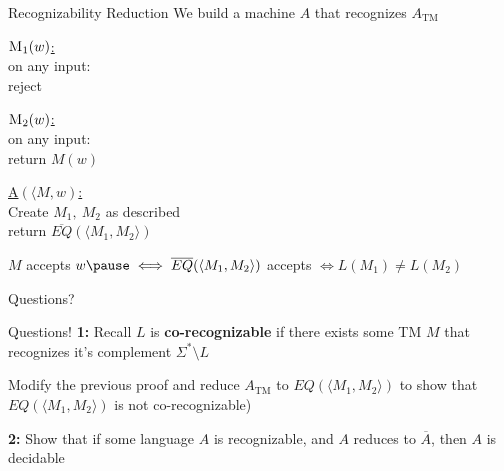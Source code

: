 \documentclass[aspectratio=169]{beamer}
\begin{document}
\begin{frame}{Recognizability Reduction}
    We build a machine $A$ that recognizes $A_{\text{TM}}$
    \begin{algo}
        \underline{$\textsc{M}_1    (w)$:}\+
    \\      on any input:\+
    \\          reject
    \end{algo}
    
    \begin{algo}
        \underline{$\textsc{M}_2(w)$:}\+
    \\      on any input:\+
    \\          return $M(w)$
    \end{algo}

    \begin{algo}
        \underline{\textsc{A}$(\langle M, w )$:}\+
    \\      Create $M_1,\ M_2$ as described
    \\      return $\overline{EQ}(\langle M_1, M_2 \rangle)$
    \end{algo} \pause

    $M$ accepts $w \pause \iff \overline{EQ}(\langle M_1, M_2 \rangle)$ accepts \pause $\iff L(M_1) \neq L(M_2)$

\end{frame}

\begin{frame}{}
    \begin{center}
        {\color{sigma@mainblue} \LARGE Questions?}
    \end{center}
\end{frame}

\begin{frame}{Questions!}
    \textbf{1:} Recall $L$ is \textbf{co-recognizable} if there exists some TM $M$ that recognizes it's complement $\Sigma^* \setminus L$ 

    Modify the previous proof and reduce $A_{\text{TM}}$ to $EQ(\langle M_1, M_2 \rangle)$ to show that $EQ(\langle M_1, M_2 \rangle)$ is not co-recognizable)
    
    \vspace{20pt}
    
    \textbf{2:} Show that if some language $A$ is recognizable, and $A$ reduces to $\overline{A}$, then $A$ is decidable
\end{frame}
\end{document}
